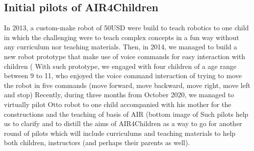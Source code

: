 \documentclass[sigconf]{acmart}
\begin{document}
\subsection{Initial pilots of AIR4Children}
In 2013, a custom-make robot of 50USD were build to teach robotics to one child in which the challenging were to teach complex concepts in a fun way without any curriculum nor teaching materials. 
Then, in 2014, we managed to build a new robot prototype that make use of voice commands for easy interaction with children (
With such prototype, we engaged with four children of a age range between 9 to 11, who enjoyed the voice command interaction of trying to move the robot in five commands (move forward, move backward, move right, move left and stop) 
Recently, during three months from October 2020, we managed to virtually pilot Otto robot to one child accompanied with his mother for the constructions and the teaching of basis of AIR (bottom image of 
Such pilots help us to clarify and to distill the aims of AIR4Children as a way to go for another round of pilots which will include curriculums and teaching materials to help both children, instructors (and perhaps their parents as well).




\end{document}
